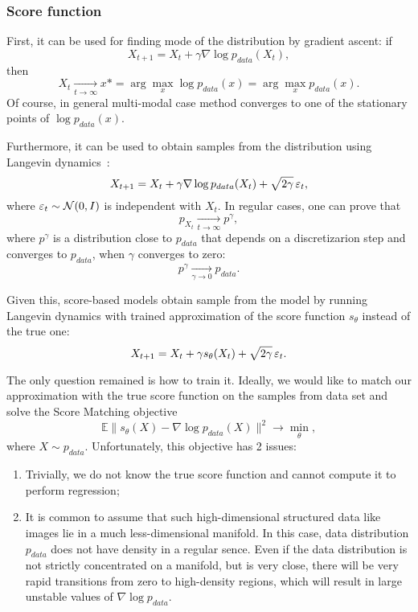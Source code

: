 \subsubsection{Score function}
First, it can be used for finding mode of the distribution by gradient ascent: if 
\[
    X_{t + 1} = X_t + \gamma \nabla \log p_{data}(X_t),
\]
then
\[
    X_t \xrightarrow[t \rightarrow \infty]{} x* = \arg\max\limits_{x} \log p_{data}(x) = \arg\max\limits_{x} p_{data}(x).
\]
Of course, in general multi-modal case method converges to one of the stationary points of $\log p_{data}(x)$.

Furthermore, it can be used to obtain samples from the distribution using Langevin dynamics~\cite{welling2011bayesian}:
\begin{equation}\label{eq:langevin_dynamics}
    X_{t + 1} = X_t + \gamma \nabla \log p_{data}(X_t) + \sqrt{2 \gamma} \, \varepsilon_t,    
\end{equation}
where $\varepsilon_t \sim \mathcal{N}(0, I)$ is independent with $X_t$. In regular cases, one can prove that 
\[
    p_{X_t} \xrightarrow[t \rightarrow \infty]{} p^{\gamma},
\]
where $p^{\gamma}$ is a distribution close to $p_{data}$ that depends on a discretizarion step and converges to $p_{data}$, when $\gamma$ converges to zero:
\[
    p^{\gamma} \xrightarrow[\gamma \rightarrow 0]{} p_{data}.
\]

Given this, score-based models obtain sample from the model by running Langevin dynamics with trained approximation of the score function $s_\theta$ instead of the true one:
\[
    X_{t + 1} = X_t + \gamma s_\theta(X_t) + \sqrt{2\gamma}\, \varepsilon_t.
\]

The only question remained is how to train it. Ideally, we would like to match our approximation with the true score function on the samples from data set and solve the Score Matching objective
\begin{equation}\label{eq:score_matching}
\mathbb{E} \| s_\theta(X) - \nabla \log p_{data}(X)\|^2 \rightarrow \min\limits_{\theta},
\end{equation}
where $X \sim p_{data}$. Unfortunately, this objective has 2 issues:
\begin{enumerate}
    \item Trivially, we do not know the true score function and cannot compute it to perform regression;
    \item It is common to assume that such high-dimensional structured data like images lie in a much less-dimensional manifold. In this case, data distribution $p_{data}$ does not have density in a regular sence. Even if the data distribution is not strictly concentrated on a manifold, but is very close, there will be very rapid transitions from zero to high-density regions, which will result in large unstable values of $\nabla \log p_{data}$.
\end{enumerate}

